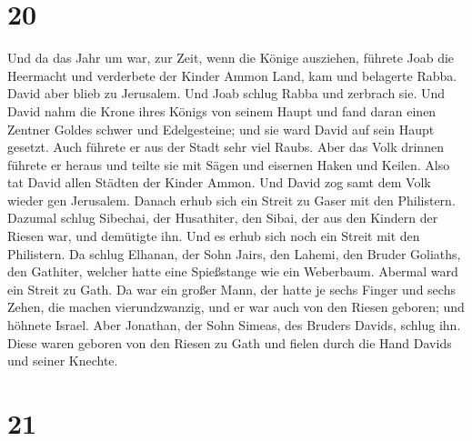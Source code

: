 \hypertarget{section-19}{%
\section{20}\label{section-19}}

 Und da das Jahr um war, zur Zeit, wenn die Könige
ausziehen, führete Joab die Heermacht und verderbete der Kinder Ammon
Land, kam und belagerte Rabba. David aber blieb zu Jerusalem. Und Joab
schlug Rabba und zerbrach sie.  Und David nahm die Krone
ihres Königs von seinem Haupt und fand daran einen Zentner Goldes schwer
und Edelgesteine; und sie ward David auf sein Haupt gesetzt. Auch
führete er aus der Stadt sehr viel Raubs.  Aber das Volk
drinnen führete er heraus und teilte sie mit Sägen und eisernen Haken
und Keilen. Also tat David allen Städten der Kinder Ammon. Und David zog
samt dem Volk wieder gen Jerusalem.  Danach erhub sich ein
Streit zu Gaser mit den Philistern. Dazumal schlug Sibechai, der
Husathiter, den Sibai, der aus den Kindern der Riesen war, und demütigte
ihn.  Und es erhub sich noch ein Streit mit den Philistern.
Da schlug Elhanan, der Sohn Jairs, den Lahemi, den Bruder Goliaths, den
Gathiter, welcher hatte eine Spießstange wie ein Weberbaum. 
Abermal ward ein Streit zu Gath. Da war ein großer Mann, der hatte je
sechs Finger und sechs Zehen, die machen vierundzwanzig, und er war auch
von den Riesen geboren;  und höhnete Israel. Aber Jonathan,
der Sohn Simeas, des Bruders Davids, schlug ihn.  Diese
waren geboren von den Riesen zu Gath und fielen durch die Hand Davids
und seiner Knechte.

\hypertarget{section-20}{%
\section{21}\label{section-20}}

